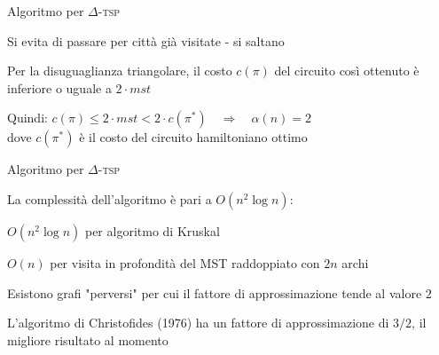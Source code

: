 \begin{frame}{Algoritmo per $\Delta$-\textsc{tsp}}

\vspace{-9pt}
\BIL
\item Si evita di passare per città già visitate - si saltano
\item Per la disuguaglianza triangolare, il costo $c(\pi)$ del circuito così
ottenuto è inferiore o uguale a $2 \cdot \mathit{mst}$
\item Quindi:
$
  c(\pi) \leq 2 \cdot \mathit{mst} < 2 \cdot c(\pi^*) \quad \Rightarrow \quad \alpha(n) = 2
$\\
dove $c(\pi^*)$ è il costo del circuito hamiltoniano ottimo
\EIL

\vspace{-12pt}

\end{frame}

\begin{frame}{Algoritmo per $\Delta$-\textsc{tsp}}

\vspace{-9pt}
\begin{myboxtitle}[Note]
\BIL
\item La complessità dell'algoritmo è pari a $O(n^2 \log n)$:
  \BI
  \item $O(n^2 \log n)$ per algoritmo di Kruskal
  \item $O(n)$ per visita in profondità del MST raddoppiato con $2n$ archi
  \EI
\item Esistono grafi "perversi" per cui il fattore di approssimazione tende
al valore $2$
\item L'algoritmo di Christofides (1976) ha un fattore di approssimazione
di $3/2$, il migliore risultato al momento
\EIL
\end{myboxtitle}
  
\end{frame}

